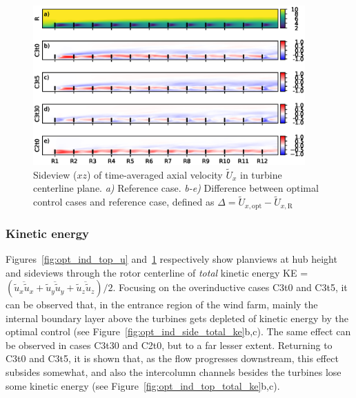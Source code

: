 	\begin{figure}[hbt]
		\centering
		\includegraphics[width=0.93\textwidth]{chapters/optimal_induction_control/sideview_u.eps}
		\caption{Sideview ($xz$) of time-averaged axial velocity $\widetilde{U}_x$ in turbine centerline plane. \emph{a) } Reference case. \emph{b-e)} Difference between optimal control cases and reference case, defined as $\Delta = \widetilde{U}_{x,\text{opt}} - \widetilde{U}_{x,\text{R}}$  \label{fig:opt_ind_side_u}}
	\end{figure}	
	
	
	\subsubsection{Kinetic energy}

	Figures~\ref{fig:opt_ind_top_u} and~\ref{fig:opt_ind_side_u} respectively show planviews at hub height and sideviews through the rotor
	centerline of \emph{total} kinetic energy KE = $(\overline{\widetilde{u}_x \widetilde{u}_x} + \overline{\widetilde{u}_y \widetilde{u}_y} + \overline{\widetilde{u}_z \widetilde{u}_z})/2$. Focusing on the overinductive cases C3t0 and C3t5, it can be observed that, in the entrance region of the wind farm, mainly the internal boundary layer above the turbines gets depleted of kinetic energy by the optimal control (see Figure~\ref{fig:opt_ind_side_total_ke}b,c). The same effect can be observed in cases C3t30 and C2t0, but to a far lesser extent. Returning to C3t0 and C3t5, it is shown that, as the flow progresses downstream, this effect subsides somewhat, and also the intercolumn channels besides the turbines lose some kinetic energy (see Figure~\ref{fig:opt_ind_top_total_ke}b,c). 

